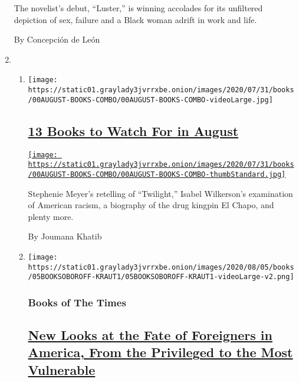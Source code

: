 \begin{enumerate}
  The novelist's debut, ``Luster,'' is winning accolades for its
  unfiltered depiction of sex, failure and a Black woman adrift in work
  and life.

  By Concepción de León
\item
  \begin{enumerate}
  \def\labelenumii{\arabic{enumii}.}
  \item
    \texttt{[image: https://static01.graylady3jvrrxbe.onion/images/2020/07/31/books/00AUGUST-BOOKS-COMBO/00AUGUST-BOOKS-COMBO-videoLarge.jpg]}

    \hypertarget{13-books-to-watch-for-in-august}{%
    \subsection{\texorpdfstring{\href{/2020/07/30/books/new-august-books.html}{13
    Books to Watch For in
    August}}{13 Books to Watch For in August}}\label{13-books-to-watch-for-in-august}}

    \href{/2020/07/30/books/new-august-books.html}{\texttt{[image: https://static01.graylady3jvrrxbe.onion/images/2020/07/31/books/00AUGUST-BOOKS-COMBO/00AUGUST-BOOKS-COMBO-thumbStandard.jpg]}}

    Stephenie Meyer's retelling of ``Twilight,'' Isabel Wilkerson's
    examination of American racism, a biography of the drug kingpin El
    Chapo, and plenty more.

    By Joumana Khatib
  \item
    \texttt{[image: https://static01.graylady3jvrrxbe.onion/images/2020/08/05/books/05BOOKSOBOROFF-KRAUT1/05BOOKSOBOROFF-KRAUT1-videoLarge-v2.png]}

    \hypertarget{books-of-the-times-1}{%
    \subsubsection{Books of The Times}\label{books-of-the-times-1}}

    \hypertarget{new-looks-at-the-fate-of-foreigners-in-america-from-the-privileged-to-the-most-vulnerable}{%
    \subsection{\texorpdfstring{\href{/2020/07/30/books/review-threat-dissent-julia-rose-kraut-separated-jacob-soboroff.html}{New
    Looks at the Fate of Foreigners in America, From the Privileged to
    the Most
    Vulnerable}}{New Looks at the Fate of Foreigners in America, From the Privileged to the Most Vulnerable}}\label{new-looks-at-the-fate-of-foreigners-in-america-from-the-privileged-to-the-most-vulnerable}}


\end{enumerate}
\end{enumerate}
